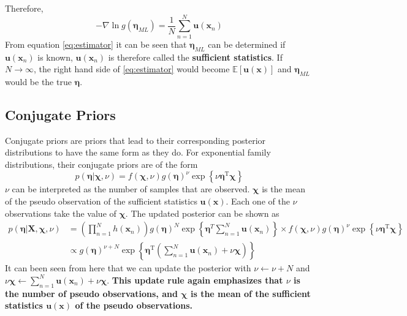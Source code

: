 \documentclass[12pt]{article}
\begin{document}
Therefore,
\begin{equation}\label{eq:estimator}
    -\nabla \ln{g(\bm{\eta}_{ML})} = \frac{1}{N}\sum_{n=1}^N\mathbf{u}(\mathbf{x}_n)
\end{equation}
From equation \ref{eq:estimator} it can be seen that $\bm{\eta}_{ML}$ can be determined if $\mathbf{u}(\mathbf{x}_n)$ is known, $\mathbf{u}(\mathbf{x}_n)$ is therefore called the \textbf{sufficient statistics}. If $N\rightarrow \infty$, the right hand side of \ref{eq:estimator} would become $\mathbb{E}[\mathbf{u}(\mathbf{x})]$ and $\bm{\eta}_{ML}$ would be the true $\bm{\eta}$.
\subsection{Conjugate Priors}
Conjugate priors are priors that lead to their corresponding posterior distributions to have the same form as they do.
For exponential family distributions, their conjugate priors are of the form
\begin{equation}\label{eq:conjugate_prior}
    p(\boldsymbol{\eta} | \boldsymbol{\chi}, \nu)=f(\boldsymbol{\chi}, \nu) g(\boldsymbol{\eta})^{\nu} \exp \left\{\nu \boldsymbol{\eta}^{\mathrm{T}} \boldsymbol{\chi}\right\}
\end{equation}
$\nu$ can be interpreted as the number of samples that are observed. $\bm{\chi}$ is the mean of the pseudo observation of the sufficient statistics $\mathbf{u}(\mathbf{x})$. Each one of the $\nu$ observations take the value of $\bm{\chi}$.
The updated posterior can be shown as
\begin{equation}\label{eq:posterior_0}
    \begin{split}
        p(\boldsymbol{\eta} | \mathbf{X}, \boldsymbol{\chi}, \nu) &=
        \left(\prod_{n=1}^{N}h(\mathbf{x}_n)\right)g(\bm{\eta})^N\exp\left\{\bm{\eta}^T\sum_{n=1}^N\mathbf{u}(\mathbf{x}_n)\right\}\times f(\boldsymbol{\chi}, \nu) g(\boldsymbol{\eta})^{\nu} \exp \left\{\nu \boldsymbol{\eta}^{\mathrm{T}} \boldsymbol{\chi}\right\}\\
        &\propto
        g(\boldsymbol{\eta})^{\nu+N} \exp \left\{\boldsymbol{\eta}^{\mathrm{T}}\left(\sum_{n=1}^{N} \mathbf{u}\left(\mathbf{x}_{n}\right)+\nu \bm{\chi}\right)\right\}
    \end{split}
\end{equation}
It can been seen from here that we can update the posterior with $\nu \leftarrow \nu+N$ and $\nu\bm{\chi} \leftarrow \sum_{n=1}^{N} \mathbf{u}\left(\mathbf{x}_{n}\right)+\nu \bm{\chi}$. \textbf{This update rule again emphasizes that $\nu$ is the number of pseudo observations, and $\bm{\chi}$ is the mean of the sufficient statistics $\mathbf{u}(\mathbf{x})$ of the pseudo observations.}
\end{document}
